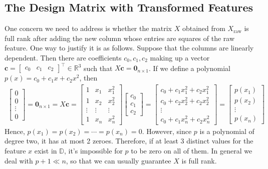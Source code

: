 \documentclass[12pt, a4paper]{article}
\theoremstyle{definition}
\begin{document}
	\subsection*{The Design Matrix with Transformed Features}
	One concern we need to address is whether the matrix $X$ obtained from
	$X_{\text{raw}}$ is full rank after adding the new column whose entries
	are squares of the raw feature. One way to justify it is as follows.
	Suppose that the columns are linearly dependent. Then there are coefficients
	$c_0,c_1,c_2$ making up a vector $\bm{c}=\begin{bmatrix}
		c_0 & c_1 & c_2
	\end{bmatrix}^\top\in\mathbb{R}^3$
	such that $X\bm{c}=\bm{0}_{n \times 1}$. If we define a polynomial $p(x)=c_0+c_1x+c_2x^2$,
	then
	\begin{align*}
		\begin{bmatrix}
			0\\
			0\\
			\vdots\\
			0
		\end{bmatrix}
		=
		\bm{0}_{n\times 1}
		=
		X\bm{c}
		=
		\begin{bmatrix}
			1 & x_1 & x_1^2\\
			1 & x_2 & x_2^2\\
			\vdots & \vdots & \vdots\\
			1 & x_n & x_n^2
		\end{bmatrix}
		\begin{bmatrix}
			c_0\\
			c_1\\
			c_2
		\end{bmatrix}
		=\begin{bmatrix}
			c_0 + c_1x_1^2 + c_2x_1^2\\
			c_0 + c_2x_2^2 + c_2x_2^2\\
			\vdots\\
			c_0 + c_1x_n^2 + c_2x_n^2
		\end{bmatrix}
		=\begin{bmatrix}
			p(x_1)\\
			p(x_2)\\
			\vdots\\
			p(x_n)
		\end{bmatrix}
	\end{align*}
	Hence, $p(x_1)=p(x_2)=\cdots=p(x_n)=0$. However, since $p$ is a polynomial of degree
	two, it has at most 2 zeroes. Therefore, if at least $3$ distinct values for the feature
	$x$ exist in $\mathbb{D}$, it's impossible for $p$ to be zero on all of them.
	In general we deal with $p + 1 \ll n$, so that we can usually guarantee
	$X$ is full rank.
	
\end{document}
